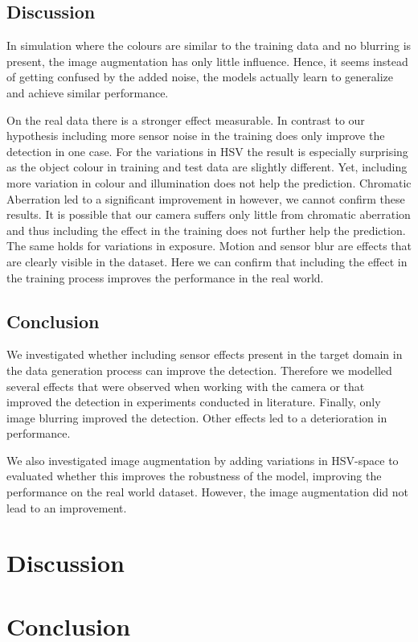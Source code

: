 \subsection{Discussion}

In simulation where the colours are similar to the training data and no blurring is present, the image augmentation has only little influence. Hence, it seems instead of getting confused by the added noise, the models actually learn to generalize and achieve similar performance.

On the real data there is a stronger effect measurable. In contrast to our hypothesis including more sensor noise in the training does only improve the detection in one case. For the variations in HSV the result is especially surprising as the object colour in training and test data are slightly different. Yet, including more variation in colour and illumination does not help the prediction. Chromatic Aberration led to a significant improvement in \cite{Carlson2018} however, we cannot confirm these results. It is possible that our camera suffers only little from  chromatic aberration and thus including the effect in the training does not further help the prediction. The same holds for variations in exposure. Motion and sensor blur are effects that are clearly visible in the dataset. Here we can confirm that including the effect in the training process improves the performance in the real world.

\subsection{Conclusion}

We investigated whether including sensor effects present in the target domain in the data generation process can improve the detection. Therefore we modelled several effects that were observed when working with the camera or that improved the detection in experiments conducted in literature. Finally, only image blurring improved the detection. Other effects led to a deterioration in performance.

We also investigated image augmentation by adding variations in HSV-space to evaluated whether this improves the robustness of the model, improving the performance on the real world dataset. However, the image augmentation did not lead to an improvement.

\section{Discussion}
\label{sec:training:discussion}

\section{Conclusion}
\label{sec:training:conclusion}
